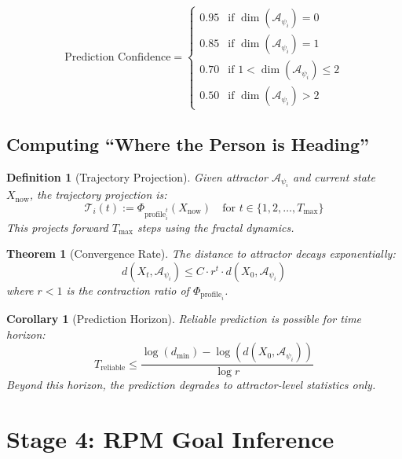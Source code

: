 \documentclass[11pt,twoside]{book}
\newcommand{\PsychAttractor}{\mathcal{A}_\psi}
\newcommand{\ProfileFrac}{\Phi_{\mathrm{profile}}}
\newcommand{\Timeline}{\mathcal{T}}
\newtheorem{definition}{Definition}[chapter]
\newtheorem{theorem}{Theorem}[chapter]
\newtheorem{corollary}{Corollary}[chapter]
\begin{document}
\begin{equation}
\boxed{
    \text{Prediction Confidence} =
    \begin{cases}
        0.95 & \text{if } \dim(\PsychAttractor_i) = 0 \\
        0.85 & \text{if } \dim(\PsychAttractor_i) = 1 \\
        0.70 & \text{if } 1 < \dim(\PsychAttractor_i) \leq 2 \\
        0.50 & \text{if } \dim(\PsychAttractor_i) > 2
    \end{cases}
}
\end{equation}

\section{Computing ``Where the Person is Heading''}

\begin{definition}[Trajectory Projection]
\label{def:trajectory-proj}
Given attractor $\PsychAttractor_i$ and current state $X_{\text{now}}$, the \emph{trajectory projection} is:
\[
    \Timeline_i(t) := \ProfileFrac_i^t(X_{\text{now}}) \quad \text{for } t \in \{1, 2, \ldots, T_{\max}\}
\]
This projects forward $T_{\max}$ steps using the fractal dynamics.
\end{definition}

\begin{theorem}[Convergence Rate]
\label{thm:convergence-rate}
The distance to attractor decays exponentially:
\[
    d(X_t, \PsychAttractor_i) \leq C \cdot r^t \cdot d(X_0, \PsychAttractor_i)
\]
where $r < 1$ is the contraction ratio of $\ProfileFrac_i$.
\end{theorem}

\begin{corollary}[Prediction Horizon]
\label{cor:prediction-horizon}
Reliable prediction is possible for time horizon:
\[
    T_{\text{reliable}} \leq \frac{\log(d_{\min}) - \log(d(X_0, \PsychAttractor_i))}{\log r}
\]
Beyond this horizon, the prediction degrades to attractor-level statistics only.
\end{corollary}

\chapter{Stage 4: RPM Goal Inference}
\label{ch:stage4-rpm}
\end{document}
